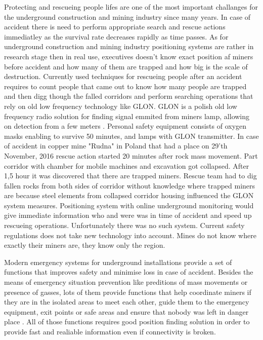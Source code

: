 \documentclass[../main.tex]{subfiles}
\begin{document}
Protecting and rescueing people lifes are one of the most important challanges for the underground construction and mining industry since many years. In case of accident there is need to perform appropriate search and rescue actions immediatley as the survival rate decreases rapidly as time passes. As for underground construction and mining industry positioning systems are rather in research stage then in real use, executives doesn't know exact position af miners before accident and how many of them are trapped and how big is the scale of destruction. Currently used techniques for rescueing people after an accident requires to count people that came out to know how many people are trapped and then digg though the falled corridors and perform searching operations that rely on old low frequency technology like GLON. GLON is a polish old low frequency radio solution for finding signal emmited from miners lamp, allowing on detection from a few meters \cite{GLON}. Personal safety equipment consists of oxygen masks enabling to survive 50 minutes, and lamps with GLON transmitter. In case of accident in copper mine "Rudna" in Poland that had a place on 29'th November, 2016  \cite{newspaper_rudna} rescue action started 20 minutes after rock mass movement. Part corridor with chamber for mobile machines and excavation got collapsed. After 1,5 hour it was discovered that there are trapped miners. Rescue team had to dig fallen rocks from both sides of corridor without knowledge where trapped miners are because steel elements from collapsed corridor housing influenced the GLON system measures. Positioning system with online underground monitoring would give immediate information who and were was in time of accident and speed up rescueing operations. Unfortunately there was no such system. Current safety regulations does not take new technology into account. Mines do not know where exactly their miners are, they know only the region.

Modern emergency systems for underground installations provide a set of functions that improves safety and minimise loss in case of accident. Besides the means of emergency situation prevention like preditions of mass movements or presence of gasses, lots of them provide functions that help coordinate miners if they are in the isolated areas to meet each other, guide them to the emergency equipment, exit points or safe areas and ensure that nobody was left in danger place \cite{Thesis_CM}. All of those functions requires good position finding solution in order to provide fast and realiable information even if connectivity is broken.
\end{document}
